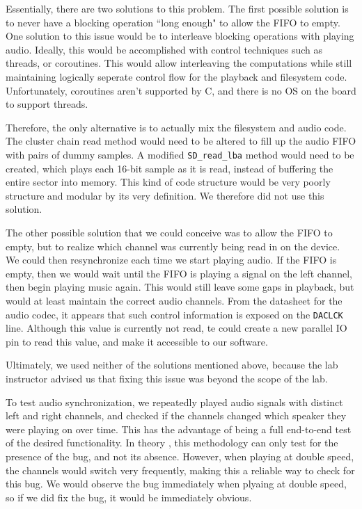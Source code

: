 \documentclass[12pt]{article}
\begin{document}
Essentially, there are two solutions to this problem.
The first possible solution is to never have a blocking operation ``long enough"
to allow the FIFO to empty.
One solution to this issue would be to interleave blocking operations with playing
audio.
Ideally, this would be accomplished with control techniques such as threads, or
coroutines.
This would allow interleaving the computations while still maintaining logically
seperate control flow for the playback and filesystem code.
Unfortunately, coroutines aren't supported by C, and there is no OS on the board
to support threads.

Therefore, the only alternative is to actually mix the filesystem and audio code.
The cluster chain read method would need to be altered to fill up the audio FIFO
with pairs of dummy samples.
A modified \texttt{SD\_read\_lba} method would need to be created, which plays
each 16-bit sample as it is read, instead of buffering the entire sector into
memory.
This kind of code structure would be very poorly structure and modular by its
very definition.
We therefore did not use this solution.

The other possible solution that we could conceive was to allow the FIFO to
empty, but to realize which channel was currently being read in on the device.
We could then resynchronize each time we start playing audio.
If the FIFO is empty, then we would wait until the FIFO is playing a signal on
the left channel, then begin playing music again.
This would still leave some gaps in playback, but would at least maintain
the correct audio channels.
From the datasheet for the audio codec, it appears that such control information
is exposed on the \texttt{DACLCK} line.
Although this value is currently not read, te could create a new parallel IO pin
to read this value, and make it accessible to our software.

Ultimately, we used neither of the solutions mentioned above, because the lab
instructor advised us that fixing this issue was beyond the scope of the lab.

To test audio synchronization, we repeatedly played audio signals with distinct
left and right channels, and checked if the channels changed which speaker they
were playing on over time.
This has the advantage of being a full end-to-end test of the desired
functionality.
In theory , this methodology can only test for the presence of the bug, and not
its absence.
However, when playing at double speed, the channels would switch very frequently,
making this a reliable way to check for this bug.
We would observe the bug immediately when plyaing at double speed, so if we
did fix the bug, it would be immediately obvious.
\end{document}
